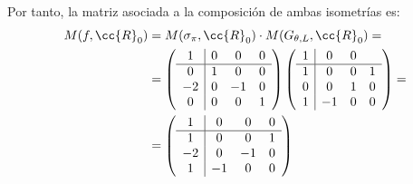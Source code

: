\begin{ejercicio}
    Por tanto, la matriz asociada a la composición de ambas isometrías es:
    \begin{align*}
        M(f, \cc{R}_0) &= M(\sigma_{{\pi}}, \cc{R}_0) \cdot M(G_{\theta, {L}}, \cc{R}_0) =\\
        &= \left(
        \begin{array}{c|ccc}
            1 & 0 & 0 & 0 \\ \hline
            0 & 1 & 0 & 0 \\
            -2 & 0 & -1 & 0 \\
            0 & 0 & 0 & 1
        \end{array}
        \right)
        \left(
        \begin{array}{c|ccc}
            1 & 0 & 0 &  \\ \hline
            1 & 0 & 0 & 1 \\
            0 & 0 & 1 & 0 \\
            1 & -1 & 0 & 0
        \end{array}
        \right)
        =\\
        &= \left(
        \begin{array}{c|ccc}
            1 & 0 & 0 & 0 \\ \hline
            1 & 0 & 0 & 1 \\
            -2 & 0 & -1 & 0 \\
            1 & -1 & 0 & 0
        \end{array}
        \right)
    \end{align*}
\end{ejercicio}

